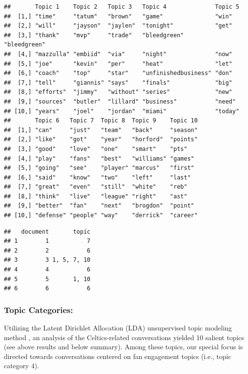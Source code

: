 \documentclass[
]{book}
\begin{document}
\begin{verbatim}
##       Topic 1    Topic 2   Topic 3   Topic 4              Topic 5     
##  [1,] "time"     "tatum"   "brown"   "game"               "win"       
##  [2,] "will"     "jayson"  "jaylen"  "tonight"            "get"       
##  [3,] "thank"    "mvp"     "trade"   "bleedgreen"         "bleedgreen"
##  [4,] "mazzulla" "embiid"  "via"     "night"              "now"       
##  [5,] "joe"      "kevin"   "per"     "heat"               "let"       
##  [6,] "coach"    "top"     "star"    "unfinishedbusiness" "don"       
##  [7,] "tell"     "giannis" "says"    "finals"             "big"       
##  [8,] "efforts"  "jimmy"   "without" "series"             "new"       
##  [9,] "sources"  "butler"  "lillard" "business"           "need"      
## [10,] "years"    "joel"    "jordan"  "miami"              "today"     
##       Topic 6   Topic 7  Topic 8  Topic 9    Topic 10
##  [1,] "can"     "just"   "team"   "back"     "season"
##  [2,] "like"    "got"    "year"   "horford"  "points"
##  [3,] "good"    "love"   "one"    "smart"    "pts"   
##  [4,] "play"    "fans"   "best"   "williams" "games" 
##  [5,] "going"   "see"    "player" "marcus"   "first" 
##  [6,] "said"    "know"   "two"    "left"     "last"  
##  [7,] "great"   "even"   "still"  "white"    "reb"   
##  [8,] "think"   "live"   "league" "right"    "ast"   
##  [9,] "better"  "fan"    "next"   "brogdon"  "point" 
## [10,] "defense" "people" "way"    "derrick"  "career"
\end{verbatim}

\begin{verbatim}
##   document       topic
## 1        1           7
## 2        2           6
## 3        3 1, 5, 7, 10
## 4        4           6
## 5        5       1, 10
## 6        6           6
\end{verbatim}

\hypertarget{topic-categories}{%
\subsubsection{Topic Categories:}\label{topic-categories}}

Utilizing the Latent Dirichlet Allocation (LDA) unsupervised topic modeling method \citep{chen2011latentdirichlet}, an analysis of the Celtics-related conversations yielded 10 salient topics (see above results and below summary). Among these topics, our special focus is directed towards conversations centered on fan engagement topics (i.e., topic category 4).
\end{document}
